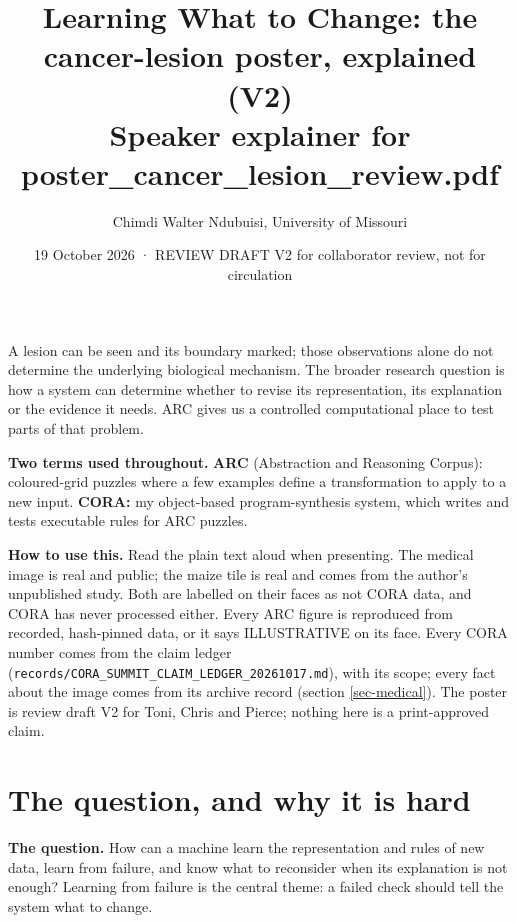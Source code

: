 \documentclass[11pt, a4paper]{article}
\author{Chimdi Walter Ndubuisi, University of Missouri}
\date{19 October 2026 · REVIEW DRAFT V2 for collaborator review, not for circulation}
\title{Learning What to Change: the cancer-lesion poster, explained (V2)\\\medskip
\large Speaker explainer for poster\_cancer\_lesion\_review.pdf}
\begin{document}
\maketitle
\raggedright

A lesion can be seen and its boundary marked; those observations alone do not determine the underlying biological
mechanism. The broader research question is how a system can determine whether to revise its representation, its
explanation or the evidence it needs. ARC gives us a controlled computational place to test parts of that problem.

\textbf{Two terms used throughout.} \textbf{ARC} (Abstraction and Reasoning Corpus): coloured-grid puzzles where a few examples define
a transformation to apply to a new input. \textbf{CORA:} my object-based program-synthesis system, which writes and tests
executable rules for ARC puzzles.

\textbf{How to use this.} Read the plain text aloud when presenting. The medical image is real and public; the maize tile is
real and comes from the author's unpublished study. Both are labelled on their faces as not CORA data, and CORA has
never processed either. Every ARC figure is reproduced from
recorded, hash-pinned data, or it says ILLUSTRATIVE on its face. Every CORA number comes from the claim ledger
(\texttt{records/CORA\_SUMMIT\_CLAIM\_LEDGER\_20261017.md}), with its scope; every fact about the image comes from its archive
record (section \ref{sec-medical}). The poster is review draft V2 for Toni, Chris and Pierce; nothing here is a
print-approved claim.

\section{The question, and why it is hard}
\label{sec-question}
\textbf{The question.} How can a machine learn the representation and rules of new data, learn from failure, and know what to
reconsider when its explanation is not enough? Learning from failure is the central theme: a failed check should tell
the system what to change.
\end{document}
